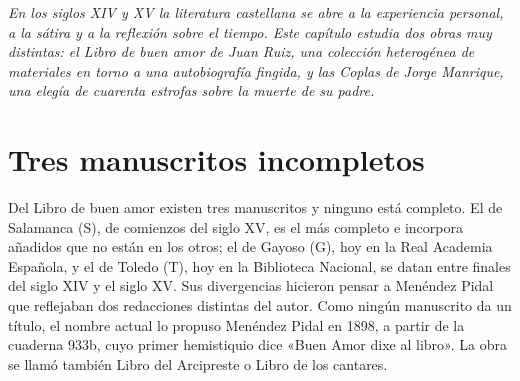 \documentclass{book}
\begin{document}
\noindent\textit{En los siglos XIV y XV la literatura castellana se abre a la experiencia personal, a la sátira y a la reflexión sobre el tiempo. Este capítulo estudia dos obras muy distintas: el Libro de buen amor de Juan Ruiz, una colección heterogénea de materiales en torno a una autobiografía fingida, y las Coplas de Jorge Manrique, una elegía de cuarenta estrofas sobre la muerte de su padre.}


\section{Tres manuscritos incompletos}

Del Libro de buen amor existen tres manuscritos y ninguno está completo. El de Salamanca (S), de comienzos del siglo XV, es el más completo e incorpora añadidos que no están en los otros; el de Gayoso (G), hoy en la Real Academia Española, y el de Toledo (T), hoy en la Biblioteca Nacional, se datan entre finales del siglo XIV y el siglo XV. Sus divergencias hicieron pensar a Menéndez Pidal que reflejaban dos redacciones distintas del autor. Como ningún manuscrito da un título, el nombre actual lo propuso Menéndez Pidal en 1898, a partir de la cuaderna 933b, cuyo primer hemistiquio dice «Buen Amor dixe al libro». La obra se llamó también Libro del Arcipreste o Libro de los cantares.

\end{document}

